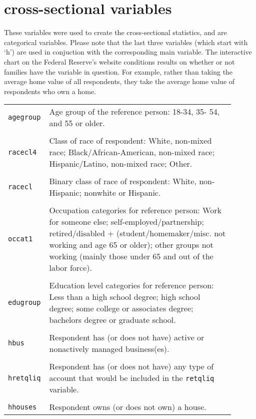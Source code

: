 \documentclass[12pt]{article}
\begin{document}
\section{cross-sectional variables}
These variables were used to create the cross-sectional statistics, and are categorical variables. Please note that the last three variables (which start with `h') are used in conjuction with the corresponding main variable. The interactive chart on the Federal Reserve's website conditions results on whether or not families have the variable in question. For example, rather than taking the average home value of all respondents, they take the average home value of respondents who own a home. 
\begin{table}[h!]
	\begin{tabular}{p{0.1\linewidth} p{0.8\linewidth}}
		\texttt{agegroup} & Age group of the reference person: 18-34, 35- 54, and 55 or older. \\\\
		\texttt{racecl4} & Class of race of respondent: White, non-mixed race; Black/African-American, non-mixed race; Hispanic/Latino, non-mixed race; Other.\\\\
		\texttt{racecl} & Binary class of race of respondent: White, non-Hispanic; nonwhite or Hispanic. \\\\
		\texttt{occat1} & Occupation categories for reference person: Work for someone else; self-employed/partnership; retired/disabled + (student/homemaker/misc. not working and age 65 or older); other groups not working (mainly those under 65 and out of the labor force).\\\\
		\texttt{edugroup} & Education level categories for reference person: Less than a high school degree; high school degree; some college or associates degree; bachelors degree or graduate school.\\\\
		\texttt{hbus} & Respondent has (or does not have) active or nonactively managed business(es). \\\\
		\texttt{hretqliq} & Respondent has (or does not have) any type of account that would be included in the \texttt{retqliq} variable.\\\\
		\texttt{hhouses} & Respondent owns (or does not own) a house. \\
	\end{tabular}
\end{table}
\end{document}
